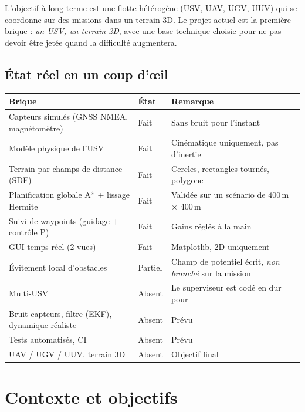 \documentclass[11pt,a4paper]{article}
\newcommand{\code}[1]{\texttt{\detokenize{#1}}}
\begin{document}
L'objectif à long terme est une flotte hétérogène (USV, UAV, UGV, UUV) qui se coordonne sur des missions dans
un terrain 3D. Le projet actuel est la première brique : \emph{un USV, un terrain 2D}, avec une base technique
choisie pour ne pas devoir être jetée quand la difficulté augmentera.

\subsection*{État réel en un coup d'œil}
\begin{center}
\begin{tabularx}{\textwidth}{>{\raggedright\arraybackslash}p{4.9cm}>{\centering\arraybackslash}p{2.0cm}X}
\toprule
\textbf{Brique} & \textbf{État} & \textbf{Remarque}\\
\midrule
Capteurs simulés (GNSS NMEA, magnétomètre) & Fait & Sans bruit pour l'instant\\
Modèle physique de l'USV & Fait & Cinématique uniquement, pas d'inertie\\
Terrain par champs de distance (SDF) & Fait & Cercles, rectangles tournés, polygone\\
Planification globale A* + lissage Hermite & Fait & Validée sur un scénario de 400\,m $\times$ 400\,m\\
Suivi de waypoints (guidage + contrôle P) & Fait & Gains réglés à la main\\
GUI temps réel (2 vues) & Fait & Matplotlib, 2D uniquement\\
Évitement local d'obstacles & Partiel & Champ de potentiel écrit, \emph{non branché} sur la mission\\
Multi-USV & Absent & Le superviseur est codé en dur pour \code{usv1}\\
Bruit capteurs, filtre (EKF), dynamique réaliste & Absent & Prévu\\
Tests automatisés, CI & Absent & Prévu\\
UAV / UGV / UUV, terrain 3D & Absent & Objectif final\\
\bottomrule
\end{tabularx}
\end{center}

\section{Contexte et objectifs}
\end{document}
